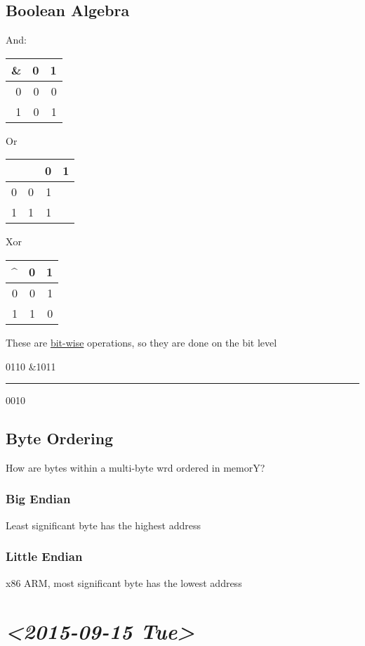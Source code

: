 \documentclass[11pt]{article}
\begin{document}
\subsection{Boolean Algebra}
\label{sec-3-2}
And:
\begin{center}
\begin{tabular}{rrr}
\& & 0 & 1\\
\hline
0 & 0 & 0\\
1 & 0 & 1\\
\end{tabular}
\end{center}

Or
\begin{center}
\begin{tabular}{rrrr}
 &  & 0 & 1\\
\hline
0 & 0 & 1\\
1 & 1 & 1\\
\end{tabular}
\end{center}

Xor
\begin{center}
\begin{tabular}{rrr}
\^{} & 0 & 1\\
\hline
0 & 0 & 1\\
1 & 1 & 0\\
\end{tabular}
\end{center}

These are \uline{bit-wise} operations, so they are done on the bit level

 0110
\&1011

\rule{\linewidth}{0.5pt}
0010

\subsection{Byte Ordering}
\label{sec-3-3}

How are bytes within a multi-byte wrd ordered in memorY?
\subsubsection{Big Endian}
\label{sec-3-3-1}
Least significant byte has the highest address
\subsubsection{Little Endian}
\label{sec-3-3-2}
x86 ARM, most significant byte  has the lowest address  
\section{\textit{<2015-09-15 Tue>}}
\label{sec-4}
\end{document}
